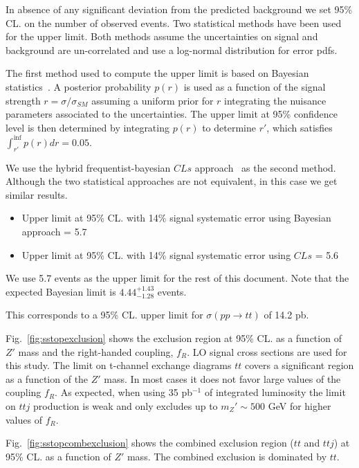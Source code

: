 In absence of any significant deviation from the predicted background we set 95\% CL. on the number of observed events. 
Two statistical methods have been used for the upper limit. 
Both methods assume the uncertainties on signal and background are un-correlated and use a log-normal distribution for error pdfs. 

The first method used to compute the upper limit is based on Bayesian statistics~\cite{bayesian}.
A posterior probability $p(r)$ is used as a function of the signal strength $r = \sigma/\sigma_{SM}$ 
assuming a uniform prior for $r$ integrating the nuisance parameters associated to the uncertainties.
The upper limit at 95\% confidence level is then determined by integrating $p(r)$ to determine $r'$, 
which satisfies $\int_{r'}^{\inf} p(r) dr = 0.05$.

We use the hybrid frequentist-bayesian $CLs$ approach~\cite{CLS} as the second method. 
Although the two statistical approaches are not equivalent, in this case we get similar results. 

\begin{itemize}
\item Upper limit at 95\% CL. with 14\% signal systematic error using Bayesian approach = 5.7  
\item Upper limit at 95\% CL. with 14\% signal systematic error using $CLs$ = 5.6  
\end{itemize}

We use 5.7 events as the upper limit for the rest of this document. 
Note that the expected Bayesian limit is 
$4.44^{+1.43}_{-1.28}$ events.

This corresponds to a 95\% CL. upper limit for $\sigma(pp \to tt)$ of 14.2 pb.


Fig.~\ref{fig:sstopexclusion} shows the exclusion region at 95\% CL. as a function of $Z'$ mass and the right-handed coupling, $f_R$. 
LO signal cross sections are used for this study. 
The limit on t-channel exchange diagrams $tt$ covers a significant region as a function of the $Z'$ mass.
In most cases it does not favor large values of the coupling $f_R$. 
As expected, when using 35 pb$^{-1}$ of integrated luminosity the limit on $ttj$ production is weak and 
only excludes up to $m_Z' \sim 500$ GeV for higher values of $f_R$. 

Fig.~\ref{fig:sstopcombexclusion} shows the combined exclusion region ($tt$ and $ttj$) at 
95\% CL. as a function of $Z'$ mass.  The combined exclusion is dominated by $tt$.

